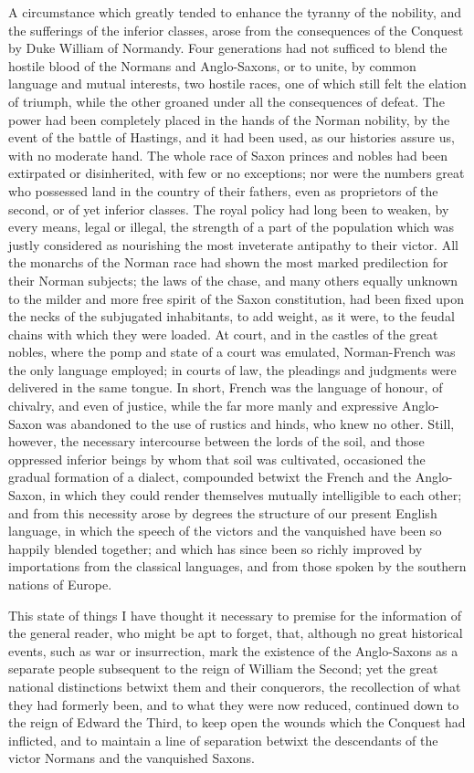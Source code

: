 A circumstance which greatly tended to enhance the tyranny of the
nobility, and the sufferings of the inferior classes, arose from the
consequences of the Conquest by Duke William of Normandy. Four
generations had not sufficed to blend the hostile blood of the Normans
and Anglo-Saxons, or to unite, by common language and mutual interests,
two hostile races, one of which still felt the elation of triumph, while
the other groaned under all the consequences of defeat. The power had
been completely placed in the hands of the Norman nobility, by the event
of the battle of Hastings, and it had been used, as our histories assure
us, with no moderate hand. The whole race of Saxon princes and nobles
had been extirpated or disinherited, with few or no exceptions; nor were
the numbers great who possessed land in the country of their fathers,
even as proprietors of the second, or of yet inferior classes. The royal
policy had long been to weaken, by every means, legal or illegal, the
strength of a part of the population which was justly considered as
nourishing the most inveterate antipathy to their victor. All the
monarchs of the Norman race had shown the most marked predilection for
their Norman subjects; the laws of the chase, and many others equally
unknown to the milder and more free spirit of the Saxon constitution,
had been fixed upon the necks of the subjugated inhabitants, to add
weight, as it were, to the feudal chains with which they were loaded. At
court, and in the castles of the great nobles, where the pomp and state
of a court was emulated, Norman-French was the only language employed;
in courts of law, the pleadings and judgments were delivered in the same
tongue. In short, French was the language of honour, of chivalry, and
even of justice, while the far more manly and expressive Anglo-Saxon was
abandoned to the use of rustics and hinds, who knew no other. Still,
however, the necessary intercourse between the lords of the soil, and
those oppressed inferior beings by whom that soil was cultivated,
occasioned the gradual formation of a dialect, compounded betwixt the
French and the Anglo-Saxon, in which they could render themselves
mutually intelligible to each other; and from this necessity arose by
degrees the structure of our present English language, in which the
speech of the victors and the vanquished have been so happily blended
together; and which has since been so richly improved by importations
from the classical languages, and from those spoken by the southern
nations of Europe.

This state of things I have thought it necessary to premise for the
information of the general reader, who might be apt to forget, that,
although no great historical events, such as war or insurrection, mark
the existence of the Anglo-Saxons as a separate people subsequent to the
reign of William the Second; yet the great national distinctions betwixt
them and their conquerors, the recollection of what they had formerly
been, and to what they were now reduced, continued down to the reign of
Edward the Third, to keep open the wounds which the Conquest had
inflicted, and to maintain a line of separation betwixt the descendants
of the victor Normans and the vanquished Saxons.

